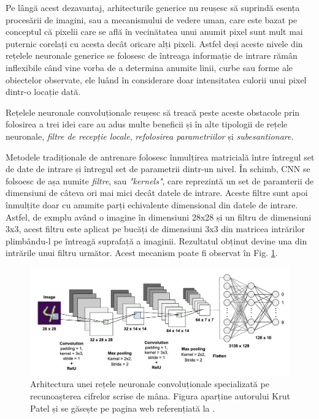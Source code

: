 \documentclass[a4paper,12pt]{book}
\begin{document}
				Pe lângă acest dezavantaj, arhitecturile generice nu reușesc să suprindă esența procesării de imagini, sau a mecanismului de vedere uman, care este bazat pe conceptul că pixelii care se află în vecinătatea unui anumit pixel sunt mult mai puternic corelați cu acesta decât oricare alți pixeli. Astfel deși aceste nivele din rețelele neuronale generice se folosesc de întreaga informație de intrare rămân inflexibile când vine vorba de a determina anumite linii, curbe sau forme ale obiectelor observate, ele luând în considerare doar intensitatea culorii unui pixel dintr-o locație dată. \par
				
				Rețelele neuronale convoluționale reușesc să treacă peste aceste obstacole prin folosirea a trei idei care au adus multe beneficii și în alte tipologii de rețele neuronale,\textit{ filtre de recepție locale}, \textit{refolosirea parametriilor} și \textit{subesantionare}. \par
				
				Metodele tradiționale de antrenare folosesc înmulțirea matricială între întregul set de date de intrare și întregul set de parametrii dintr-un nivel. În schimb, CNN se folsoesc de așa numite \textit{filtre}, sau \textit{"kernels"}, care reprezintă un set de paramterii de dimensiuni de câteva ori mai mici decât datele de intrare. Aceste filtre sunt apoi înmulțite doar cu anumite parți echivalente dimensional din datele de intrare. Astfel, de exmplu având o imagine în dimensiuni 28x28 și un filtru de dimensiuni 3x3, acest filtru este aplicat pe bucăți de dimensiuni 3x3 din matricea intrărilor plimbându-l pe întreagă suprafață a imaginii. Rezultatul obținut devine una din intrările unui filtru următor. Acest mecanism poate fi observat în Fig. \ref{fig:cnns}.
					
				\begin{figure}[t]
					\centering
					\includegraphics[scale=0.23]{cnns}
					\caption{Arhitectura unei rețele neuronale convoluționale specializată pe recunoașterea cifrelor scrise de mâna. Figura aparține autorului Krut Patel și se găsește pe pagina web referențiată la \cite{cnn_photo}.} 
					\label{fig:cnns}
				\end{figure}
				
\end{document}
